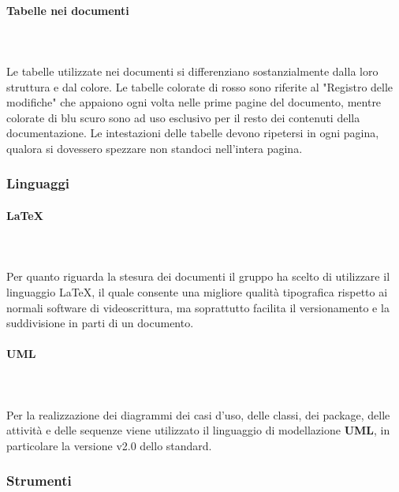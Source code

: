 \paragraph{Tabelle nei documenti}\mbox{} \\ \\
Le tabelle utilizzate nei documenti si differenziano sostanzialmente dalla loro struttura e dal colore. Le tabelle colorate di rosso sono riferite al "Registro delle modifiche"
che appaiono ogni volta nelle prime pagine del documento, mentre colorate di blu scuro sono ad uso esclusivo per il resto dei contenuti della documentazione.
Le intestazioni delle tabelle devono ripetersi in ogni pagina, qualora si dovessero spezzare non standoci nell'intera pagina.

\subsubsection{Linguaggi}
\paragraph{\LaTeX}\mbox{} \\ \\
Per quanto riguarda la stesura dei documenti il gruppo ha scelto di utilizzare il linguaggio \LaTeX{}, il quale consente una migliore qualità tipografica rispetto ai normali software di videoscrittura, ma soprattutto facilita il versionamento e la suddivisione in parti di un documento.

\paragraph{UML}\mbox{}\\ \\
Per la realizzazione dei diagrammi dei casi d'uso, delle classi, dei package, delle attività e delle sequenze viene utilizzato il linguaggio di modellazione \textbf{UML}, in particolare la versione v2.0 dello standard.

\subsubsection{Strumenti}

